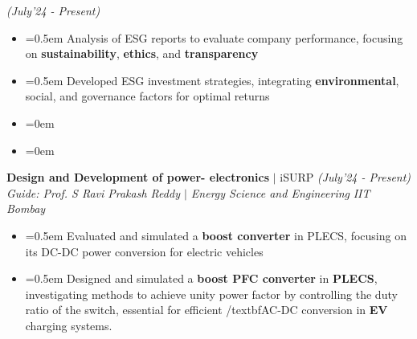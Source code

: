 \documentclass{article}
\begin{document}
  \hfill{\sl \small (July'24 - Present)}
\vspace{-7pt}
\begin{itemize}[label=\textcolor{myblue}{\textbullet},itemsep = -1.25mm, leftmargin=5.5mm]
\item{}\font=0.5em Analysis of ESG reports to evaluate company performance, focusing on \textbf{sustainability}, \textbf{ethics}, and \textbf{transparency}
\item{}\font=0.5em Developed ESG investment strategies, integrating \textbf{environmental}, social, and governance factors for optimal returns
\item{}\font=0em 
 
\item{}\font=0em 
\end{itemize}


\vspace{-5pt}

\noindent
{\fontsize{12}{12} \textbf{Design and Development of
power- electronics} $|$ iSURP}  \hfill{\sl \small (July'24 - Present)}\\
{\it Guide: Prof. S Ravi Prakash Reddy $|$ Energy Science and Engineering} \hfill{\it IIT Bombay}\hspace{-2pt}
\vspace{-7pt}
\begin{itemize}[label=\textcolor{myblue}{\textbullet},itemsep = -1.25mm, leftmargin=5.5mm]
\item{}\font=0.5em Evaluated and simulated a \textbf{boost converter} in PLECS, focusing on its DC-DC power conversion for electric vehicles
\item{}\font=0.5em Designed and simulated a \textbf{boost PFC converter} in \textbf{PLECS}, investigating methods to achieve unity power factor by controlling the duty ratio of the switch, essential for efficient /textbf{AC-DC} conversion in \textbf{EV} charging systems.
\end{itemize}
\end{document}
